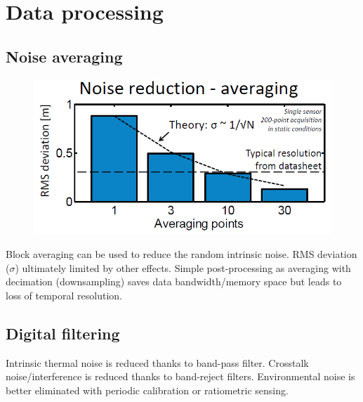 \section{Data processing}

\subsection{Noise averaging}

\begin{minipage}{0.52\linewidth}

\begin{figure}[H]
    \centering
    \includegraphics[width = \textwidth]{L6/img/averaging.PNG}
\end{figure}

\end{minipage}\hfill
\begin{minipage}{0.45\linewidth}
Block averaging can be used to reduce the random
intrinsic noise. RMS deviation ($\sigma$) ultimately limited by other effects. Simple post-processing as averaging with decimation
(downsampling) saves data bandwidth/memory
space but leads to loss of temporal resolution.
\end{minipage}

\subsection{Digital filtering}

Intrinsic thermal noise is reduced thanks to band-pass filter. 
Crosstalk noise/interference is reduced thanks to band-reject filters.
Environmental noise is better eliminated with periodic calibration or ratiometric sensing.


